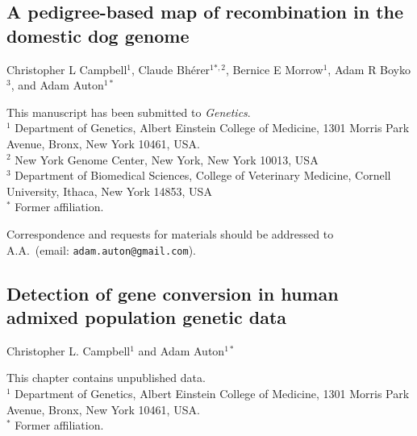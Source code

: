\documentclass[11pt,twoside,openright,letterpaper]{memoir}
\begin{document}


\begin{SingleSpace}
\chapter{A pedigree-based map of recombination in the domestic dog genome} \label{ch:dogPed}

\noindent Christopher L Campbell$^1$, Claude Bh\'{e}rer$^{1*,2}$, Bernice E Morrow$^1$, Adam R Boyko$^3$, and Adam Auton$^{1*}$

\vspace{0.5cm}
\noindent This manuscript has been submitted to \textit{Genetics}. \\

\vspace{0.5cm}
\noindent $^1$ Department of Genetics, Albert Einstein College of Medicine, 1301 Morris Park Avenue, Bronx, New York 10461, USA. \\
\noindent $^2$ New York Genome Center, New York, New York 10013, USA \\
\noindent $^3$ Department of Biomedical Sciences, College of Veterinary Medicine, Cornell University, Ithaca, New York 14853, USA \\
\noindent $^*$ Former affiliation.

\vspace{0.5cm}
\begin{centering}
    Correspondence and requests for materials should be addressed to \\
    A.A.\ (email: \texttt{adam.auton@gmail.com}). \\
\end{centering}
\end{SingleSpace}



\begin{SingleSpace}
\chapter{Detection of gene conversion in human admixed population genetic data} \label{ch:geneConv}

\noindent Christopher L. Campbell$^1$ and Adam Auton$^{1*}$

\vspace{0.5cm}
\noindent This chapter contains unpublished data.\\

\vspace{0.5cm}
\noindent $^1$ Department of Genetics, Albert Einstein College of Medicine, 1301 Morris Park Avenue, Bronx, New York 10461, USA. \\
\noindent $^*$ Former affiliation.
\end{SingleSpace}
\end{document}

